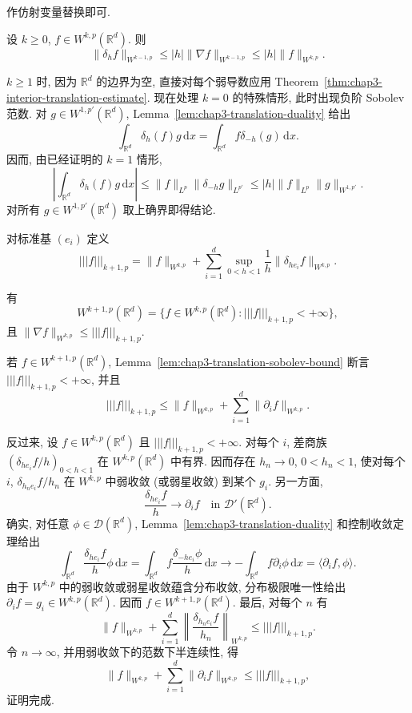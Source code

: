 \begin{Proof}
作仿射变量替换即可.
\end{Proof}

\begin{Lemma}
\label{lem:chap3-translation-sobolev-bound}
设 $k\geq0$, $f\in W^{k,p}(\mathbb R^d)$. 则
\[
 \|\delta_hf\|_{W^{k-1,p}}\leq|h|\|\nabla f\|_{W^{k-1,p}}
 \leq|h|\|f\|_{W^{k,p}}.
\]
\end{Lemma}

\begin{Proof}
$k\geq1$ 时, 因为 $\mathbb R^d$ 的边界为空, 直接对每个弱导数应用 Theorem~\ref{thm:chap3-interior-translation-estimate}. 现在处理 $k=0$ 的特殊情形, 此时出现负阶 Sobolev 范数. 对 $g\in W^{1,p'}(\mathbb R^d)$, Lemma~\ref{lem:chap3-translation-duality} 给出
\[
 \int_{\mathbb R^d}\delta_h(f)g\,\mathrm dx
 =\int_{\mathbb R^d}f\delta_{-h}(g)\,\mathrm dx.
\]
因而, 由已经证明的 $k=1$ 情形,
\[
 \left|\int_{\mathbb R^d}\delta_h(f)g\,\mathrm dx\right|
 \leq\|f\|_{L^p}\|\delta_{-h}g\|_{L^{p'}}
 \leq|h|\|f\|_{L^p}\|g\|_{W^{1,p'}}.
\]
对所有 $g\in W^{1,p'}(\mathbb R^d)$ 取上确界即得结论.
\end{Proof}

对标准基 $(e_i)$ 定义
\[
 |||f|||_{k+1,p}=\|f\|_{W^{k,p}}+
 \sum_{i=1}^d\sup_{0<h<1}\frac1h\|\delta_{he_i}f\|_{W^{k,p}}.
\]

\begin{Proposition}
\label{prop:chap3-sobolev-difference-quotient-characterization}
有
\[
 W^{k+1,p}(\mathbb R^d)=\{f\in W^{k,p}(\mathbb R^d):|||f|||_{k+1,p}<+\infty\},
\]
且 $\|\nabla f\|_{W^{k,p}}\leq|||f|||_{k+1,p}$.
\end{Proposition}

\begin{Proof}
若 $f\in W^{k+1,p}(\mathbb R^d)$, Lemma~\ref{lem:chap3-translation-sobolev-bound} 断言 $|||f|||_{k+1,p}<+\infty$, 并且
\[
 |||f|||_{k+1,p}\leq\|f\|_{W^{k,p}}
 +\sum_{i=1}^d\|\partial_if\|_{W^{k,p}}.
\]

反过来, 设 $f\in W^{k,p}(\mathbb R^d)$ 且 $|||f|||_{k+1,p}<+\infty$. 对每个 $i$, 差商族 $(\delta_{he_i}f/h)_{0<h<1}$ 在 $W^{k,p}(\mathbb R^d)$ 中有界. 因而存在 $h_n\to0$, $0<h_n<1$, 使对每个 $i$, $\delta_{h_ne_i}f/h_n$ 在 $W^{k,p}$ 中弱收敛 (或弱星收敛) 到某个 $g_i$. 另一方面,
\[
 \frac{\delta_{he_i}f}{h}\longrightarrow\partial_if
 \quad\text{in }\mathcal D'(\mathbb R^d).
\]
确实, 对任意 $\phi\in\mathcal D(\mathbb R^d)$, Lemma~\ref{lem:chap3-translation-duality} 和控制收敛定理给出
\[
 \int_{\mathbb R^d}\frac{\delta_{he_i}f}{h}\phi\,\mathrm dx
 =\int_{\mathbb R^d}f\frac{\delta_{-he_i}\phi}{h}\,\mathrm dx
 \longrightarrow-\int_{\mathbb R^d}f\partial_i\phi\,\mathrm dx
 =\langle\partial_if,\phi\rangle.
\]
由于 $W^{k,p}$ 中的弱收敛或弱星收敛蕴含分布收敛, 分布极限唯一性给出 $\partial_if=g_i\in W^{k,p}(\mathbb R^d)$. 因而 $f\in W^{k+1,p}(\mathbb R^d)$. 最后, 对每个 $n$ 有
\[
 \|f\|_{W^{k,p}}+\sum_{i=1}^d
 \left\|\frac{\delta_{h_ne_i}f}{h_n}\right\|_{W^{k,p}}
 \leq|||f|||_{k+1,p}.
\]
令 $n\to\infty$, 并用弱收敛下的范数下半连续性, 得
\[
 \|f\|_{W^{k,p}}+\sum_{i=1}^d\|\partial_if\|_{W^{k,p}}
 \leq|||f|||_{k+1,p},
\]
证明完成.
\end{Proof}

